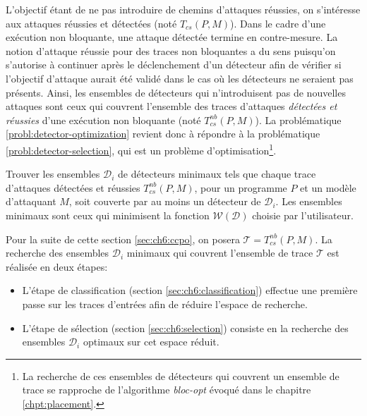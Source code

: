             L'objectif étant de ne pas introduire de chemins d'attaques réussies, on s'intéresse aux attaques réussies et détectées (noté $T_{cs}(P, M)$).   
            Dans le cadre d'une exécution non bloquante, une attaque détectée termine en contre-mesure. 
            La notion d'attaque réussie pour des traces non bloquantes a du sens puisqu'on s'autorise à continuer après le déclenchement d'un détecteur afin de vérifier si l'objectif d'attaque aurait été validé dans le cas où les détecteurs ne seraient pas présents.                            
            Ainsi, les ensembles de détecteurs qui n'introduisent pas de nouvelles attaques sont ceux qui couvrent l'ensemble des traces d'attaques \textit{détectées et réussies} d'une exécution non bloquante (noté $T_{cs}^{nb}(P, M)$).
            La problématique \ref{probl:detector-optimization} revient donc à répondre à la problématique \ref{probl:detector-selection}, qui est un problème d'optimisation\footnote{La recherche de ces ensembles de détecteurs qui couvrent un ensemble de trace se rapproche de l'algorithme \textit{bloc-opt} évoqué dans le chapitre \ref{chpt:placement}.}.   

            \begin{probl}
                \label{probl:detector-selection}
                Trouver les ensembles $\mathcal{D}_i$ de détecteurs minimaux tels que chaque trace d'attaques détectées et réussies $T^{nb}_{cs}(P, M)$, pour un programme $P$ et un modèle d'attaquant $M$, soit couverte par au moins un détecteur de $\mathcal{D}_i$.
                Les ensembles minimaux sont ceux qui minimisent la fonction $\mathcal{W}(\mathcal{D})$ choisie par l'utilisateur.
            \end{probl}

            Pour la suite de cette section \ref{sec:ch6:ccpo}, on posera $\mathcal{T} = T^{nb}_{cs}(P, M)$.
            La recherche des ensembles $\mathcal{D}_i$ minimaux qui couvrent l'ensemble de trace $\mathcal{T}$ est réalisée en deux étapes:
            \begin{itemize}
                \item L'étape de classification (section \ref{sec:ch6:classification}) effectue une première passe sur les traces d'entrées afin de réduire l'espace de recherche.
                \item L'étape de sélection (section \ref{sec:ch6:selection}) consiste en la recherche des ensembles $\mathcal{D}_i$ optimaux  sur cet espace réduit.
            \end{itemize}
         
